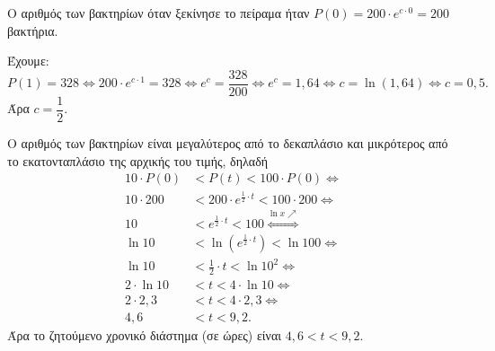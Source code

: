 \begin{alist}
\item Ο αριθμός των βακτηρίων όταν ξεκίνησε το πείραμα ήταν $P(0) = 200\cdot e^{c\cdot 0} = 200$ βακτήρια.
\item Έχουμε:
\[P(1) = 328 \Leftrightarrow 200\cdot e^{c\cdot 1} = 328 \Leftrightarrow e^c = \frac{328}{200} \Leftrightarrow e^c = 1{,}64 \Leftrightarrow c = \ln(1{,}64) \Leftrightarrow c = 0{,}5.\]
Άρα $c = \dfrac{1}{2}$.
\item Ο αριθμός των βακτηρίων είναι μεγαλύτερος από το δεκαπλάσιο και μικρότερος από το εκατονταπλάσιο της αρχικής του τιμής, δηλαδή
\begin{align*}
10\cdot P(0) &< P(t) < 100\cdot P(0) \Leftrightarrow \\
10\cdot 200 &< 200\cdot e^{\frac{1}{2}\cdot t} < 100\cdot 200 \Leftrightarrow \\
10 &< e^{\frac{1}{2}\cdot t} < 100 \overset{\ln x \nearrow}{\iff} \\
\ln 10 &< \ln(e^{\frac{1}{2}\cdot t}) < \ln 100 \Leftrightarrow \\
\ln 10 &< \frac{1}{2}\cdot t < \ln 10^2 \Leftrightarrow \\
2\cdot\ln 10 &< t < 4\cdot\ln 10 \Leftrightarrow \\
2\cdot 2{,}3 &< t < 4\cdot 2{,}3 \Leftrightarrow \\
4{,}6 &< t < 9{,}2.
\end{align*}
Άρα το ζητούμενο χρονικό διάστημα (σε ώρες) είναι $4{,}6 < t < 9{,}2$.
\end{alist}

